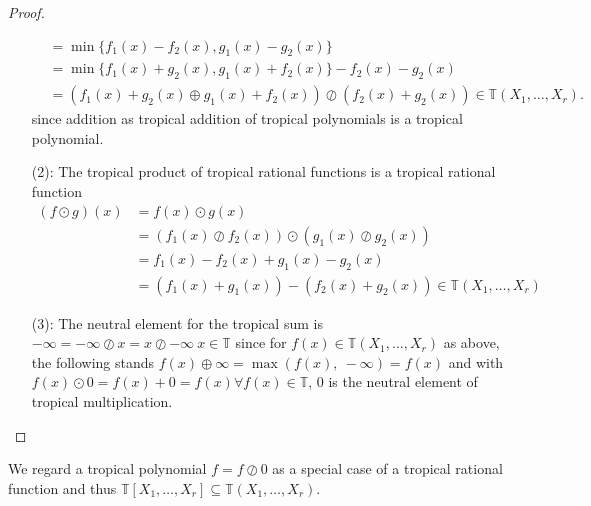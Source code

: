 \documentclass{article}
\theoremstyle{definition}
\newtheorem{comment}[theorem]{Comment}
\begin{document}
\begin{proof}
\begin{itemize}
\begin{align*}
&= \min\{f_1(x) - f_2(x), g_1(x) - g_2(x) \} \\
&= \min\{f_1(x) + g_2(x), g_1(x) + f_2(x) \} - f_2(x) - g_2(x) \\
&= (f_1(x) + g_2(x) \oplus g_1(x) + f_2(x)) \oslash (f_2(x) + g_2(x)) \in \mathbb{T}(X_1, \dots , X_r).
\end{align*}
since addition as tropical addition of tropical polynomials is a tropical polynomial.
\item[(2):]
The tropical product of tropical rational functions is a tropical rational function
\begin{align*}
(f \odot g)(x) &= f(x) \odot g(x) \\
&=  (f_1(x) \oslash f_2(x)) \odot (g_1(x) \oslash g_2(x)) \\
&= f_1(x) - f_2(x) + g_1(x) - g_2(x) \\
&= (f_1(x) + g_1(x)) - (f_2(x) + g_2(x)) \in \mathbb{T}(X_1, \dots , X_r)
\end{align*}
\item[(3):]
The neutral element for the tropical sum is $- \infty = - \infty \oslash x = x \oslash - \infty \ x \in \mathbb{T}$ since for $f(x) \in \mathbb{T}(X_1, \dots , X_r)$ as above, the following stands $ f(x) \oplus \infty = \max(f(x),\ - \infty) = f(x)$ and with $f(x) \odot 0 = f(x) + 0 = f(x) \forall f(x) \in \mathbb{T}$, $0$ is the neutral element of tropical multiplication.
\end{itemize}
\end{proof}

We regard a tropical polynomial $f=f \oslash 0$ as a special case of a tropical rational function and thus $\mathbb{T}[X_1, \dots , X_r] \subseteq \mathbb{T}(X_1, \dots , X_r)$. \cite[p.~3]{zhang2018tropical}

\end{document}
